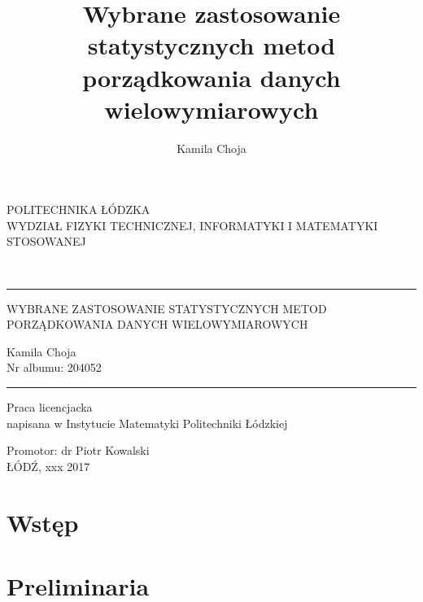 \documentclass[12pt,a4paper]{report}
\author{Kamila Choja}
\title{Wybrane zastosowanie statystycznych metod porządkowania danych wielowymiarowych}
\begin{document}
\begin{titlepage}

\begin{center}
        \vspace*{1cm}
        {\large POLITECHNIKA ŁÓDZKA}\\
       \vspace*{1cm}
        {\large WYDZIAŁ FIZYKI TECHNICZNEJ, INFORMATYKI I MATEMATYKI STOSOWANEJ}\\
        \vspace*{2cm}
    \end{center}        
        
\\
\vspace*{0.3cm}
\hspace*{0.3cm}
  
\begin{center}
\rule{\textwidth}{0.5pt}

\vspace*{0.5cm}
   
{\large WYBRANE ZASTOSOWANIE STATYSTYCZNYCH METOD\\ }
{\large PORZĄDKOWANIA DANYCH WIELOWYMIAROWYCH\\}
\vspace*{1cm}


\begin{flushright}
Kamila Choja\\
Nr albumu: 204052 
 \end{flushright}
\rule{\textwidth}{0.5pt}

Praca licencjacka\\
napisana w Instytucie Matematyki Politechniki Łódzkiej\\

\vspace*{2cm}

Promotor: dr Piotr Kowalski\\
\vfill
ŁÓDŹ, xxx 2017


     \end{center}   
\end{titlepage}

\tableofcontents

\chapter{Wstęp}


\chapter{Preliminaria}  
\end{document}
